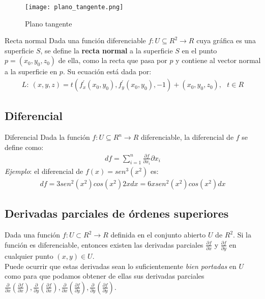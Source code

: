 \documentclass[a4paper, twoside]{article}
\numberwithin{equation}{section}
\numberwithin{figure}{section}
\numberwithin{table}{section}
\begin{document}
\begin{minipage}{0.25\textwidth}
	\begin{figure}[H]
		\texttt{[image: plano\_tangente.png]}
		\caption{Plano tangente}
	\end{figure}
\end{minipage}
\begin{minipage}{0.8\textwidth}
	\begin{definicion*}{Recta normal}
		Dada una función diferenciable $f:U\subseteq R^2 \rightarrow R$ cuya gráfica es una superficie $S$, se define la \textbf{recta normal} a la superficie $S$ en el punto $p=(x_0,y_0,z_0)$ de ella, como la recta que pasa por $p$ y contiene al vector normal a la superficie en $p.$ Su ecuación está dada por:
		\begin{align}
			L:\:(x,y,z)=t(f^\prime_{x}(x_0,y_0),f^\prime_{y}(x_0,y_0),-1)+(x_0,y_0,z_0), \text{ } t \in R
		\end{align}
	\end{definicion*}
\end{minipage}

\subsection{Diferencial}
\begin{definicion*}{Diferencial}
	Dada la función $f:U\subseteq R^n \rightarrow R$ diferenciable, la diferencial de $f$ se define como:
	\begin{align}
		df=\sum_{i=1}^{n}\frac{\partial f}{\partial x_i}\partial x_i
	\end{align}
	\textit{Ejemplo}: el diferencial de $f(x)=sen^3(x^2)$	es:
	\begin{align}
		df=3sen^2(x^2)cos(x^2)2xdx=6xsen^2(x^2)cos(x^2)dx
	\end{align}
\end{definicion*}

\subsection{Derivadas parciales de órdenes superiores}
Dada una función $f: U \subset R^2 \rightarrow R$ definida en el conjunto abierto $U$ de $R^2$. Si la función es diferenciable, entonces existen las derivadas parciales $\frac{\partial f}{\partial x}$ y $\frac{\partial f}{\partial y}$ en cualquier punto $(x,y)\in U$.\\

Puede ocurrir que estas derivadas sean lo suficientemente \emph{bien portadas} en $U$ como para que podamos obtener de ellas sus derivadas parciales $\frac{\partial}{\partial x}\left(\frac{\partial f}{\partial x}\right),\frac{\partial}{\partial y}\left(\frac{\partial f}{\partial x}\right),\frac{\partial}{\partial x}\left(\frac{\partial f}{\partial y}\right),\frac{\partial}{\partial y}\left(\frac{\partial f}{\partial y}\right)$.\\
\end{document}
